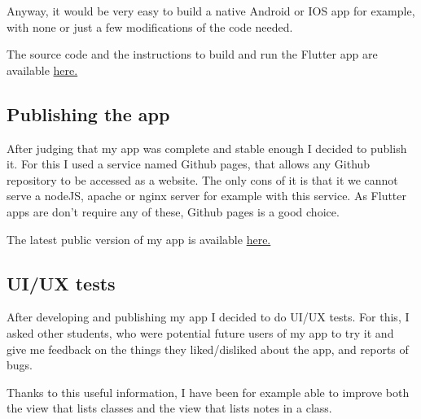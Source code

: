 \documentclass[]{article}
\begin{document}
	Anyway, it would be very easy to build a native Android or IOS app for example, with none or just a few modifications of the code needed.\linebreak
	
	The source code and the instructions to build and run the Flutter app are available \href{https://github.com/Logan-Developer/ui-lahumbert/tree/main/FinalProject/note_taking_app}{here.}
	
	\subsection{Publishing the app}
	
	After judging that my app was complete and stable enough I decided to publish it.\linebreak
	For this I used a service named Github pages, that allows any Github repository to be accessed as a website.\linebreak
	The only cons of it is that it we cannot serve a nodeJS, apache or nginx server for example with this service.\linebreak
	As Flutter apps are don't require any of these, Github pages is a good choice.\linebreak
	
	The latest public version of my app is available \href{https://class-snap.tech/}{here.}
	
	\pagebreak
	
	\subsection{UI/UX tests}
	
	After developing and publishing my app I decided to do UI/UX tests.\linebreak
	For this, I asked other students, who were potential future users of my app to try it and give me feedback on the things they liked/disliked about the app, and reports of bugs.\linebreak
	
	Thanks to this useful information, I have been for example able to improve both the view that lists classes and the view that lists notes in a class.
	
\end{document}

